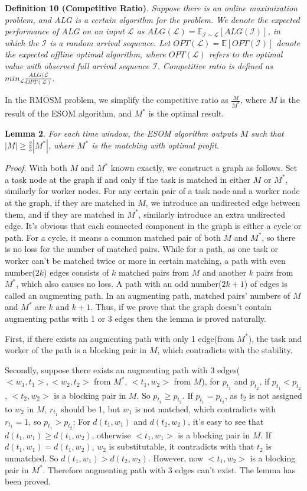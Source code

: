 \documentclass[color,twoside,amssymb,twocolumn]{article}
\begin{document}
\textbf{Definition 10 (Competitive Ratio)}. {\it Suppose there is an online maximization problem, and ALG is a certain algorithm for the problem. We denote the expected performance of ALG on an input $\mathcal{L}$ as $ALG(\mathcal{L})=\mathbb{E}_{\mathcal{I} \sim \mathcal{L}}[ALG(\mathcal{I})]$, in which the $\mathcal{I}$ is a random arrival sequence. Let $OPT(\mathcal{L})=\mathbb{E}[OPT(\mathcal{I})]$ denote the expected offline optimal algorithm, where $OPT(\mathcal{L})$ refers to the optimal value with observed full arrival sequence $\mathcal{I}$. Competitive ratio is defined as $min_{\mathcal{L}}\frac{ALG(\mathcal{L}}{OPT(\mathcal{L})}$.
}

In the RMOSM problem, we simplify the competitive ratio as $\frac{M}{M^{*}}$, where $M$ is the result of the ESOM algorithm, and $M^{*}$ is the optimal result. 

\textbf{Lemma 2}. {\it For each time window, the ESOM algorithm outputs $M$ such that $|M| \geq \frac{2}{3}|M^*|$, where $M^*$ is the matching with optimal profit.}

{\it Proof}. With both $M$ and $M^*$ known exactly, we construct a graph as follows. Set a task node at the graph if and only if the task is matched in either $M$ or $M^*$, similarly for worker nodes. For any certain pair of a task node and a worker node at the graph, if they are matched in $M$, we introduce an undirected edge between them, and if they are matched in $M^*$, similarly introduce an extra undirected edge. It's obvious that each connected component in the graph is either a cycle or path.
For a cycle, it means a common matched pair of both $M$ and $M^*$, so there is no loss for the number of matched pairs. While for a path, as one task or worker can't be matched twice or more in certain matching, a path with even number($2k$) edges consists of $k$ matched pairs from $M$ and another $k$ pairs from $M^*$, which also causes no loss. A path with an odd number($2k+1$) of edges is called an augmenting path. In an augmenting path, matched pairs' numbers of $M$ and $M^*$ are $k$ and $k+1$. Thus, if we prove that the graph doesn't contain augmenting paths with 1 or 3 edges then the lemma is proved naturally.

First, if there exists an augmenting path with only 1 edge(from $M^*$), the task and worker of the path is a blocking pair in $M$, which contradicts with the stability.

Secondly, suppose there exists an augmenting path with 3 edges($<w_1,t_1>,<w_2,t_2>$ from $M^*$, $<t_1,w_2>$ from $M$), for $p_{t_1}$ and $p_{t_2}$, if $p_{t_1} < p_{t_2}$, $<t_2,w_2>$ is a blocking pair in $M$. So $p_{t_1} \geq p_{t_2}$. If $p_{t_1} = p_{t_2}$, as $t_2$ is not assigned to $w_2$ in $M$, $r_{t_1}$ should be 1, but $w_1$ is not matched, 
which contradicts with $r_{t_1}=1$, so $p_{t_1} > p_{t_2}$; For $d(t_1,w_1)$ and $d(t_2,w_2)$, it's easy to see that $d(t_1,w_1) \geq d(t_1,w_2)$, otherwise $<t_1,w_1>$ is a blocking pair in $M$. If $d(t_1,w_1) = d(t_1,w_2)$, $w_2$ is substitutable, it contradicts with that $t_2$ is unmatched.
So $d(t_1,w_1) > d(t_2,w_2)$. However, now $<t_1,w_2>$ is a blocking pair in $M^*$. Therefore augmenting path with 3 edges can't exist. The lemma has been proved.
\end{document}
